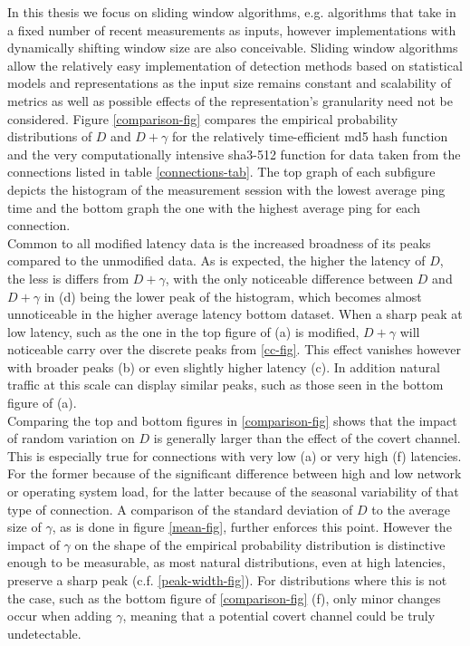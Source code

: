 \documentclass[12pt,a4paper,automark, toc=bib]{scrreprt}
\theoremstyle{definition}
\begin{document}
			In this thesis we focus on sliding window algorithms, e.g. algorithms that take in a fixed number of recent measurements as inputs, however implementations with dynamically shifting window size are also conceivable. Sliding window algorithms allow the relatively easy implementation of detection methods based on statistical models and representations as the input size remains constant and scalability of metrics as well as possible effects of the representation's granularity need not be considered.
			\label{assess_var}
			Figure \ref{comparison-fig} compares the empirical probability distributions of $D$ and $D+\gamma$ for the relatively time-efficient md5 hash function and the very computationally intensive sha3-512 function for data taken from the connections listed in table \ref{connections-tab}. The top graph of each subfigure depicts the histogram of the measurement session with the lowest average ping time and the bottom graph the one with the highest average ping for each connection. \\
			Common to all modified latency data is the increased broadness of its peaks compared to the unmodified data. As is expected, the higher the latency of $D$, the less is differs from $D+\gamma$, with the only noticeable difference between $D$ and $D + \gamma$ in (d) being the lower peak of the histogram, which becomes almost unnoticeable in the higher average latency bottom dataset. When a sharp peak at low latency, such as the one in the top figure of (a) is modified, $D+\gamma$ will noticeable carry over the discrete peaks from \ref{cc-fig}. This effect vanishes however with broader peaks (b) or even slightly higher latency (c). In addition natural traffic at this scale can display similar peaks, such as those seen in the bottom figure of (a). \\
			Comparing the top and bottom figures in \ref{comparison-fig} shows that the impact of random variation on $D$ is generally larger than the effect of the covert channel. This is especially true for connections with very low (a) or very high (f) latencies. For the former because of the significant difference between high and low network or operating system load, for the latter because of the seasonal variability of that type of connection. A comparison of the standard deviation of $D$ to the average size of $\gamma$, as is done in figure \ref{mean-fig}, further enforces this point.
			However the impact of $\gamma$ on the shape of the empirical probability distribution is distinctive enough to be measurable, as most natural distributions, even at high latencies, preserve a sharp peak (c.f. \ref{peak-width-fig}). For distributions where this is not the case, such as the bottom figure of \ref{comparison-fig} (f), only minor changes occur when adding $\gamma$, meaning that a potential covert channel could be truly undetectable.\\
			
\end{document}
